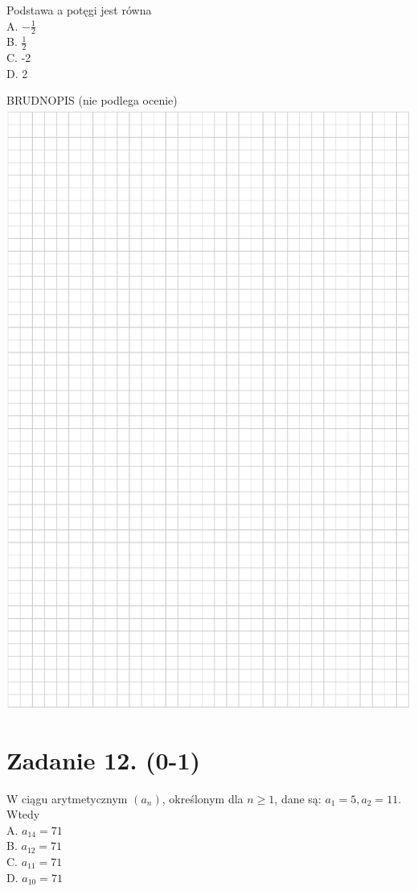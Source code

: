 \documentclass[10pt]{article}
\begin{document}
Podstawa a potęgi jest równa\\
A. \(-\frac{1}{2}\)\\
B. \(\frac{1}{2}\)\\
C. -2\\
D. 2

BRUDNOPIS (nie podlega ocenie)\\
\includegraphics[max width=\textwidth, center]{2024_11_21_7b5527312ea89ae66fd0g-07}

\section*{Zadanie 12. (0-1)}
W ciągu arytmetycznym \(\left(a_{n}\right)\), określonym dla \(n \geq 1\), dane są: \(a_{1}=5, a_{2}=11\). Wtedy\\
A. \(a_{14}=71\)\\
B. \(a_{12}=71\)\\
C. \(a_{11}=71\)\\
D. \(a_{10}=71\)
\end{document}
